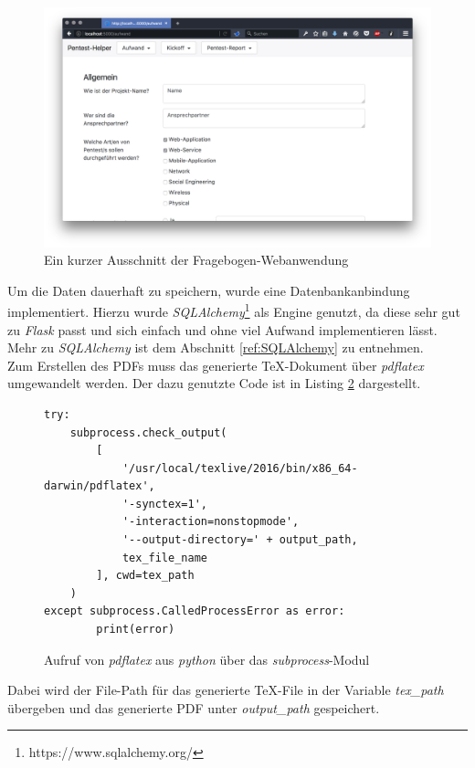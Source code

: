 \begin{figure}[htbp]
	\centering
	\includegraphics[width=\textwidth]{bilder/pentest_prozesse/vorbereitung/fragebogen_web.png}
	\caption{Ein kurzer Ausschnitt der Fragebogen-Webanwendung}
	\label{fig:FragWeb}
\end{figure}

Um die Daten dauerhaft zu speichern, wurde eine Datenbankanbindung implementiert. Hierzu wurde \textit{SQLAlchemy}\footnote{https://www.sqlalchemy.org/} als Engine genutzt, da diese sehr gut zu \textit{Flask} passt und sich einfach und ohne viel Aufwand implementieren lässt. Mehr zu \textit{SQLAlchemy} ist dem Abschnitt \ref{ref:SQLAlchemy} zu entnehmen.\\

Zum Erstellen des PDFs muss das generierte TeX-Dokument über \textit{pdflatex} umgewandelt werden. Der dazu genutzte Code ist in Listing \ref{lis:PenProzAufwPDFLatex} dargestellt.

\begin{figure}[htbp]
\begin{lstlisting}
try:
    subprocess.check_output(
        [
            '/usr/local/texlive/2016/bin/x86_64-darwin/pdflatex',
            '-synctex=1',
            '-interaction=nonstopmode',
            '--output-directory=' + output_path,
            tex_file_name
        ], cwd=tex_path
    )
except subprocess.CalledProcessError as error:
        print(error)
\end{lstlisting}
\caption{Aufruf von \textit{pdflatex} aus \textit{python} über das \textit{subprocess}-Modul}
\label{lis:PenProzAufwPDFLatex}
\end{figure}

Dabei wird der File-Path für das generierte TeX-File in der Variable \textit{tex\_path} übergeben und das generierte PDF unter \textit{output\_path} gespeichert.\\

